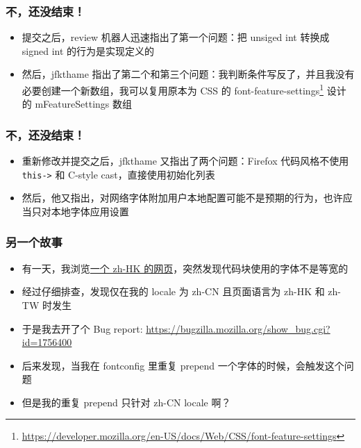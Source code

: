 \documentclass[UTF-8]{ctexbeamer}
\begin{document}
\begin{frame}[fragile]
	\frametitle{不，还没结束！}
	
	\begin{itemize}[<+->]
		\item 提交之后，review 机器人迅速指出了第一个问题：把 unsiged int 转换成 signed int 的行为是实现定义的
		\item 然后，jfkthame 指出了第二个和第三个问题：我判断条件写反了，并且我没有必要创建一个新数组，我可以复用原本为 CSS 的 font-feature-settings\footnote{\url{https://developer.mozilla.org/en-US/docs/Web/CSS/font-feature-settings}} 设计的 mFeatureSettings 数组
	\end{itemize}
	
\end{frame}

\begin{frame}[fragile]
	\frametitle{不，还没结束！}
	
	\begin{itemize}[<+->]
		\item 重新修改并提交之后，jfkthame 又指出了两个问题：Firefox 代码风格不使用 \verb|this->| 和 C-style cast，直接使用初始化列表
		\item 然后，他又指出，对网络字体附加用户本地配置可能不是预期的行为，也许应当只对本地字体应用设置
	\end{itemize}
	
\end{frame}

\begin{frame}[fragile]
	\frametitle{另一个故事}
	
	\begin{itemize}[<+->]
		\item 有一天，我浏览\href{https://asaba.sakuragawa.moe/2021/07/%e4%bf%ae%e5%be%a9-fedora-gnu-linux-%e7%b3%bb%e7%b5%b1%e4%b8%8b%e7%9a%84%e9%8d%b5%e7%9b%a4%e5%8a%9f%e8%83%bd%e5%8d%80%ef%bc%88f-%e5%8d%80%ef%bc%89%e6%8c%89%e9%8d%b5/}{一个 zh-HK 的网页}，突然发现代码块使用的字体不是等宽的
		\item 经过仔细排查，发现仅在我的 locale 为 zh-CN 且页面语言为 zh-HK 和 zh-TW 时发生
		\item 于是我去开了个 Bug report: \url{https://bugzilla.mozilla.org/show_bug.cgi?id=1756400}
		\item 后来发现，当我在 fontconfig 里重复 prepend 一个字体的时候，会触发这个问题
		\item 但是我的重复 prepend 只针对 zh-CN locale 啊？
	\end{itemize}
	
\end{frame}
\end{document}
